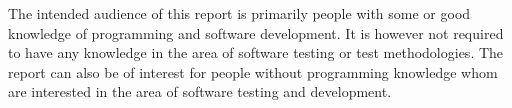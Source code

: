 The intended audience of this report is primarily people with some or
good knowledge of programming and software development. It is however
not required to have any knowledge in the area of software testing or
test methodologies. The report can also be of interest for people
without programming knowledge whom are interested in the area of
software testing and development.\\
